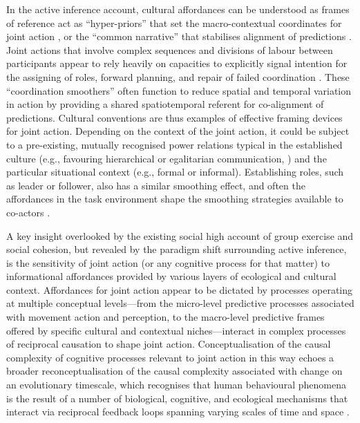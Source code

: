 \begin{CJK}{UTF8}{gbsn}
In the active inference account, cultural affordances can be understood as frames of reference act as ``hyper-priors'' that set the macro-contextual coordinates for joint action \citep{Clark2013}, or the ``common narrative'' that stabilises alignment of predictions \citep{Friston2015}.  Joint actions that involve complex sequences and divisions of labour between participants appear to rely heavily on capacities to explicitly signal intention for the assigning of roles, forward planning, and repair of failed coordination \citep{Frith2010}.  These ``coordination smoothers'' \citep{Vesper2017} often function to reduce spatial and temporal variation in action by providing a shared spatiotemporal referent for co-alignment of predictions.  Cultural conventions are thus examples of effective framing devices for joint action.  Depending on the context of the joint action, it could be subject to a pre-existing, mutually recognised power relations typical in the established culture (e.g., favouring hierarchical or egalitarian communication, \citep[see]{Cheon2011}) and the particular situational context (e.g., formal or informal).  Establishing roles, such as leader or follower, also has a similar smoothing effect, and often the affordances in the task environment shape the smoothing strategies available to co-actors \citep{Marsh2009}.

A key insight overlooked by the existing social high account of group exercise and social cohesion, but revealed by the paradigm shift surrounding active inference, is the sensitivity of joint action (or any cognitive process for that matter) to informational affordances provided by various layers of ecological and cultural context.  Affordances for joint action appear to be dictated by processes operating at multiple conceptual levels---from the micro-level predictive processes associated with movement action and perception, to the macro-level predictive frames offered by specific cultural and contextual niches---interact in complex processes of reciprocal causation to shape joint action.  Conceptualisation of the causal complexity of cognitive processes relevant to joint action in this way echoes a broader reconceptualisation of the causal complexity associated with change on an evolutionary timescale, which recognises that human behavioural phenomena is the result of a number of biological, cognitive, and ecological mechanisms that interact via reciprocal feedback loops spanning varying scales of time and space \citep{Fuentes2015}.





\end{CJK}
